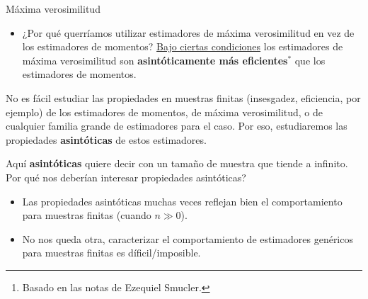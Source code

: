 \documentclass{beamer}
\title{\color{black}{Análisis Estadístico}}
\subtitle{\color{rosee}M\'etodo de estimaci\'on de m\'axima verosimilitud\footnote{Basado en las notas de Ezequiel Smucler.}}
\institute[]{UTDT}
\date[UTDT 2021]{}
\theoremstyle{definition}
\begin{document}
\begin{frame}
  \titlepage
\end{frame}

\begin{frame}{\color{rosee}M\'axima verosimilitud}
 \small \begin{itemize}
\item    ¿Por qu\'e querr\'iamos utilizar estimadores de m\'axima verosimilitud en vez de los estimadores de momentos? \underline{Bajo ciertas condiciones} los estimadores de m\'axima verosimilitud
    son \textbf{asint\'oticamente m\'as eficientes}${}^*$ que los estimadores de momentos.

  \end{itemize}

  No es fácil estudiar las propiedades en muestras finitas
  (insesgadez, eficiencia, por ejemplo) de los estimadores de momentos,
  de m\'axima verosimilitud, o de cualquier familia grande de
  estimadores para el caso. Por eso, estudiaremos las propiedades
  \textbf{asint\'oticas} de estos estimadores.

  \bigskip Aqu\'i \textbf{asint\'oticas} quiere decir con un tama\~no de
  muestra que tiende a infinito. Por qu\'e nos deber\'ian interesar
  propiedades asintóticas?\medskip
  \begin{itemize}
  \item Las propiedades asintóticas muchas veces reflejan bien el
    comportamiento para muestras finitas (cuando $n\gg 0$).\medskip
  \item No nos queda otra, caracterizar el comportamiento de estimadores
    gen\'ericos para muestras finitas es d\'ificil/imposible.
  \end{itemize}
\end{frame}
\end{document}
